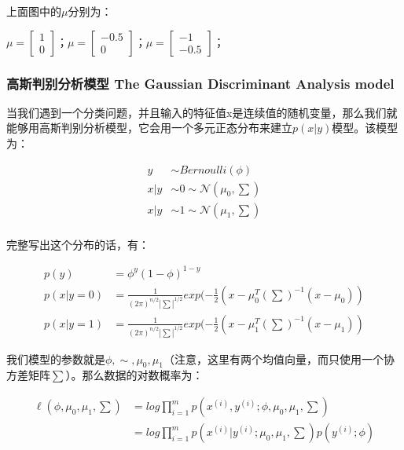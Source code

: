 \documentclass[UTF8]{ctexart}
\begin{document}
上面图中的$\mu$分别为：
\begin{center}
$\mu  = \begin{bmatrix} 1   \\ 0\end{bmatrix}；\mu  = \begin{bmatrix} -0.5   \\ 0\end{bmatrix} ；\mu  = \begin{bmatrix} -1   \\ -0.5 \end{bmatrix}$；
\end{center}




\subsubsection{高斯判别分析模型 The Gaussian Discriminant Analysis model}

当我们遇到一个分类问题，并且输入的特征值x是连续值的随机变量，那么我们就能够用高斯判别分析模型，它会用一个多元正态分布来建立$p(x|y)$模型。该模型为：


\begin{align*}
y & \sim Bernoulli(\phi)\\
x|y & \sim 0 \sim \mathcal{N}(\mu_{0},\sum)\\
x|y & \sim 1 \sim \mathcal{N}(\mu_{1},\sum)\\
\end{align*}


完整写出这个分布的话，有：


\begin{align*}
p(y) & = \phi^{y} (1-\phi)^{1-y} \\
p(x|y=0) & = \frac{1}{(2\pi)^{n/2}|\sum|^{1/2}} exp (-\frac{1}{2}(x-\mu_{0}^{T}(\sum)^{-1}(x-\mu_{0})) \\
p(x|y=1) & = \frac{1}{(2\pi)^{n/2}|\sum|^{1/2}} exp (-\frac{1}{2}(x-\mu_{1}^{T}(\sum)^{-1}(x-\mu_{1}))
\end{align*}



我们模型的参数就是$\phi,\sim,\mu_{0},\mu_{1}$（注意，这里有两个均值向量，而只使用一个协方差矩阵$\sum$）。那么数据的对数概率为：


\begin{align*} 
\ell (\phi,\mu_{0},\mu_{1},\sum) & = log \prod_{i=1}^{m}  p(x^{(i)},y^{(i)};\phi,\mu_{0},\mu_{1},\sum) \\
& = log \prod_{i=1}^{m}  p(x^{(i)}|y^{(i)};\mu_{0},\mu_{1},\sum)p(y^{(i)};\phi) \\
\end{align*}
\end{document}
